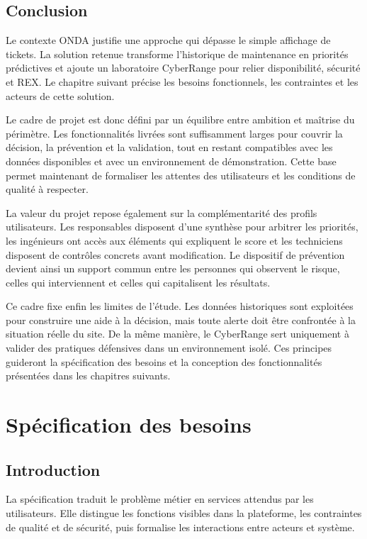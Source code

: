 \documentclass[12pt,a4paper,oneside]{report}
\begin{document}
\clearpage
\section{Conclusion}

Le contexte ONDA justifie une approche qui dépasse le simple affichage de tickets. La solution retenue transforme l’historique de maintenance en priorités prédictives et ajoute un laboratoire CyberRange pour relier disponibilité, sécurité et REX. Le chapitre suivant précise les besoins fonctionnels, les contraintes et les acteurs de cette solution.

Le cadre de projet est donc défini par un équilibre entre ambition et maîtrise du périmètre. Les fonctionnalités livrées sont suffisamment larges pour couvrir la décision, la prévention et la validation, tout en restant compatibles avec les données disponibles et avec un environnement de démonstration. Cette base permet maintenant de formaliser les attentes des utilisateurs et les conditions de qualité à respecter.

La valeur du projet repose également sur la complémentarité des profils utilisateurs. Les responsables disposent d’une synthèse pour arbitrer les priorités, les ingénieurs ont accès aux éléments qui expliquent le score et les techniciens disposent de contrôles concrets avant modification. Le dispositif de prévention devient ainsi un support commun entre les personnes qui observent le risque, celles qui interviennent et celles qui capitalisent les résultats.

Ce cadre fixe enfin les limites de l’étude. Les données historiques sont exploitées pour construire une aide à la décision, mais toute alerte doit être confrontée à la situation réelle du site. De la même manière, le CyberRange sert uniquement à valider des pratiques défensives dans un environnement isolé. Ces principes guideront la spécification des besoins et la conception des fonctionnalités présentées dans les chapitres suivants.

\clearpage
\chapter{Spécification des besoins}

\section{Introduction}

La spécification traduit le problème métier en services attendus par les utilisateurs. Elle distingue les fonctions visibles dans la plateforme, les contraintes de qualité et de sécurité, puis formalise les interactions entre acteurs et système.
\end{document}
